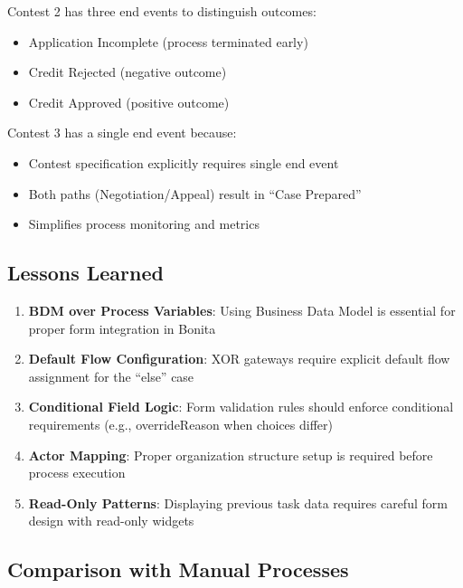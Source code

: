 \documentclass[12pt,a4paper]{article}
\begin{document}
Contest 2 has three end events to distinguish outcomes:
\begin{itemize}
    \item Application Incomplete (process terminated early)
    \item Credit Rejected (negative outcome)
    \item Credit Approved (positive outcome)
\end{itemize}

Contest 3 has a single end event because:
\begin{itemize}
    \item Contest specification explicitly requires single end event
    \item Both paths (Negotiation/Appeal) result in ``Case Prepared''
    \item Simplifies process monitoring and metrics
\end{itemize}

\subsection{Lessons Learned}

\begin{enumerate}
    \item \textbf{BDM over Process Variables}: Using Business Data Model is essential for proper form integration in Bonita

    \item \textbf{Default Flow Configuration}: XOR gateways require explicit default flow assignment for the ``else'' case

    \item \textbf{Conditional Field Logic}: Form validation rules should enforce conditional requirements (e.g., overrideReason when choices differ)

    \item \textbf{Actor Mapping}: Proper organization structure setup is required before process execution

    \item \textbf{Read-Only Patterns}: Displaying previous task data requires careful form design with read-only widgets
\end{enumerate}

\subsection{Comparison with Manual Processes}
\end{document}
